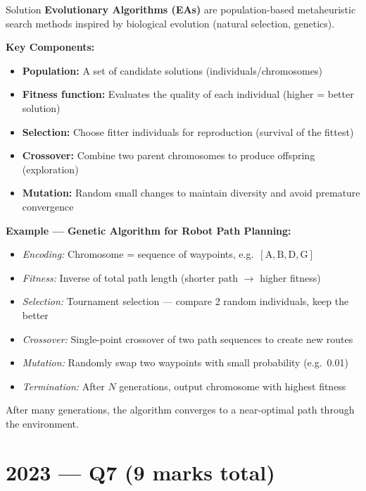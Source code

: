 \documentclass[12pt,a4paper]{article}
\begin{document}
\begin{solbox}{Solution}
\textbf{Evolutionary Algorithms (EAs)} are population-based metaheuristic search methods inspired by biological evolution (natural selection, genetics).

\textbf{Key Components:}
\begin{itemize}[noitemsep]
  \item \textbf{Population:} A set of candidate solutions (individuals/chromosomes)
  \item \textbf{Fitness function:} Evaluates the quality of each individual (higher = better solution)
  \item \textbf{Selection:} Choose fitter individuals for reproduction (survival of the fittest)
  \item \textbf{Crossover:} Combine two parent chromosomes to produce offspring (exploration)
  \item \textbf{Mutation:} Random small changes to maintain diversity and avoid premature convergence
\end{itemize}

\textbf{Example --- Genetic Algorithm for Robot Path Planning:}
\begin{itemize}[noitemsep]
  \item \textit{Encoding:} Chromosome = sequence of waypoints, e.g.\ $[\text{A},\text{B},\text{D},\text{G}]$
  \item \textit{Fitness:} Inverse of total path length (shorter path $\to$ higher fitness)
  \item \textit{Selection:} Tournament selection --- compare 2 random individuals, keep the better
  \item \textit{Crossover:} Single-point crossover of two path sequences to create new routes
  \item \textit{Mutation:} Randomly swap two waypoints with small probability (e.g.\ 0.01)
  \item \textit{Termination:} After $N$ generations, output chromosome with highest fitness
\end{itemize}
After many generations, the algorithm converges to a near-optimal path through the environment.
\end{solbox}

\newpage
\section{2023 --- Q7 (9 marks total)}
\end{document}
